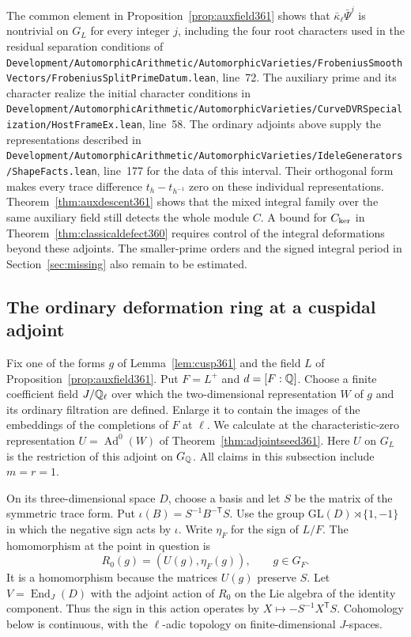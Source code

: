 \documentclass[a4paper,11pt]{article}
\theoremstyle{definition}
\theoremstyle{remark}
\newcommand{\srcloc}[2]{{\small\nolinkurl{#1.lean}}, line~#2}
\numberwithin{equation}{section}
\begin{document}
The common element in Proposition~\ref{prop:auxfield361} shows that
\(\bar\kappa_\ell\bar\Psi^j\) is nontrivial on \(G_L\) for every
integer \(j\), including the four root characters used in the
residual separation conditions of
\srcloc{Development/AutomorphicArithmetic/AutomorphicVarieties/FrobeniusSmoothVectors/FrobeniusSplitPrimeDatum}{72}.
The auxiliary prime and its character realize the initial
character conditions in
\srcloc{Development/AutomorphicArithmetic/AutomorphicVarieties/CurveDVRSpecialization/HostFrameEx}{58}.
The ordinary adjoints above supply the representations described in
\srcloc{Development/AutomorphicArithmetic/AutomorphicVarieties/IdeleGenerators/ShapeFacts}{177}
for the data of this interval. Their orthogonal form makes every
trace difference \(t_h-t_{h^{-1}}\) zero on these individual
representations. Theorem~\ref{thm:auxdescent361} shows that the
mixed integral family over the same auxiliary field still
detects the whole module \(C\). A bound for \(C_{\rm ker}\) in
Theorem~\ref{thm:classicaldefect360} requires control of the
integral deformations beyond these adjoints. The smaller-prime
orders and the signed integral period in Section~\ref{sec:missing}
also remain to be estimated.


\subsection{The ordinary deformation ring at a cuspidal adjoint}
\label{sec:weightchart362}

Fix one of the forms \(g\) of Lemma~\ref{lem:cusp361} and the field
\(L\) of Proposition~\ref{prop:auxfield361}. Put \(F=L^+\) and
\(d=[F:\mathbb Q]\). Choose a finite coefficient field \(J/\mathbb Q_\ell\)
over which the two-dimensional representation \(W\) of \(g\)
and its ordinary filtration are defined. Enlarge it to contain
the images of the embeddings of the completions of \(F\) at
\(\ell\). We calculate at the characteristic-zero representation
\(U=\operatorname{Ad}^0(W)\) of Theorem~\ref{thm:adjointseed361}.
Here \(U\) on \(G_L\) is the restriction of this adjoint on
\(G_\mathbb Q\). All claims in this subsection include \(m=r=1\).

On its three-dimensional space \(D\), choose a basis and let \(S\)
be the matrix of the symmetric trace form. Put
\(\iota(B)=S^{-1}B^{-\mathsf T}S\).
Use the group \(\mathrm{GL}(D)\rtimes\{1,-1\}\) in which the
negative sign acts by \(\iota\). Write \(\eta_F\) for the sign
of \(L/F\). The homomorphism at the point in question is
\[
        R_0(g)=(U(g),\eta_F(g)),\qquad g\in G_F .
\]
It is a homomorphism because the matrices \(U(g)\) preserve \(S\).
Let \(V=\operatorname{End}_J(D)\) with the adjoint action of
\(R_0\) on the Lie algebra of the identity component. Thus the
sign in this action operates by \(X\mapsto-S^{-1}X^{\mathsf T}S\).
Cohomology below is continuous, with the \(\ell\)-adic topology
on finite-dimensional \(J\)-spaces.
\end{document}

